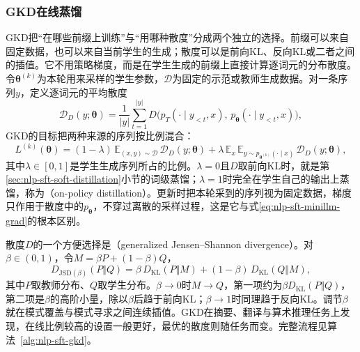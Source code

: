 \subsubsection{GKD在线蒸馏}
\label{sec:nlp-sft-gkd}

GKD把“在哪些前缀上训练”与“用哪种散度”分成两个独立的选择。前缀可以来自固定数据，也可以来自当前学生的生成；散度可以是前向KL、反向KL或二者之间的插值。它不用策略梯度，而是在学生生成的前缀上直接计算逐词元的分布散度。令$\bm\theta^{(k)}$为本轮用来采样的学生参数，$\mathcal D$为固定的示范或教师生成数据。对一条序列$y$，定义逐词元的平均散度
\[
 \mathcal D_D(y;\bm\theta)=\frac1{\lvert y\rvert}\sum_{t=1}^{\lvert y\rvert}
 D\bigl(p_T(\cdot\mid y_{<t},x),\,p_{\bm\theta}(\cdot\mid y_{<t},x)\bigr),
\]
GKD的目标把两种来源的序列按比例混合：
\begin{equation}
\label{eq:nlp-sft-gkd}
 L^{(k)}(\bm{\theta})
 =(1-\lambda)\,\mathbb{E}_{(x,y)\sim\mathcal D}\,\mathcal D_D(y;\bm\theta)
 +\lambda\,\mathbb{E}_{x}\,\mathbb E_{y\sim p_{\bm\theta^{(k)}}(\cdot\mid x)}\,\mathcal D_D(y;\bm\theta),
\end{equation}
其中$\lambda\in[0,1]$是学生生成序列所占的比例。$\lambda=0$且$D$取前向KL时，就是第\ref{sec:nlp-sft-soft-distillation}小节的词级蒸馏；$\lambda=1$时完全在学生自己的输出上蒸馏，称为（on-policy distillation）。更新时把本轮采到的序列视为固定数据，梯度只作用于散度中的$p_{\bm\theta}$，不穿过离散的采样过程，这是它与式\eqref{eq:nlp-sft-minillm-grad}的根本区别。

散度$D$的一个方便选择是（generalized Jensen--Shannon divergence）。对$\beta\in(0,1)$，令$M=\beta P+(1-\beta)Q$，
\begin{equation}
 D_{\mathrm{JSD}(\beta)}(P\Vert Q)=\beta\,D_{\mathrm{KL}}(P\Vert M)+(1-\beta)\,D_{\mathrm{KL}}(Q\Vert M),
 \label{eq:nlp-sft-gjsd}
\end{equation}
其中$P$取教师分布、$Q$取学生分布。$\beta\to0$时$M\to Q$，第一项约为$\beta D_{\mathrm{KL}}(P\Vert Q)$，第二项是$\beta$的高阶小量，除以$\beta$后趋于前向KL；$\beta\to1$时同理趋于反向KL。调节$\beta$就在模式覆盖与模式寻求之间连续插值。GKD在摘要、翻译与算术推理任务上发现，在线比例较高的设置一般更好，最优的散度则随任务而变。完整流程见算法~\ref{alg:nlp-sft-gkd}。

